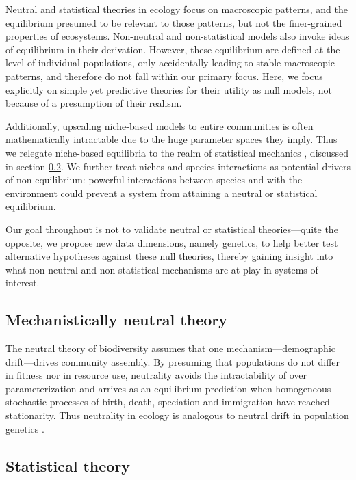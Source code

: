 \documentclass[12pt]{article}
\begin{document}
Neutral and statistical theories in ecology focus on macroscopic
patterns, and the equilibrium presumed to be relevant to those
patterns, but not the finer-grained properties of ecosystems. Non-neutral and
non-statistical models \citep[e.g.,][]{Tilman2004-xt, Chesson2000-uc}
also invoke ideas of equilibrium in their derivation. However, these
equilibrium are defined at the level of individual populations,
only accidentally leading to stable macroscopic patterns, and therefore do not
fall within our primary focus.  Here, we focus explicitly on simple yet
predictive theories for their utility as null models, not because of a
presumption of their realism.

Additionally, upscaling niche-based models to entire communities is
often mathematically intractable due to the huge parameter spaces they
imply.  Thus we relegate niche-based equilibria to the realm of
statistical mechanics \citep[as have others:][]{pueyo2007, neill2009,
  Harte2011-um}, discussed in section \ref{sec:statThr}. We further
treat niches and species interactions as potential drivers of
non-equilibrium: powerful interactions between species and with the
environment could prevent a system from attaining a neutral or
statistical equilibrium.

Our goal throughout is not to validate neutral or statistical
theories---quite the opposite, we propose new data dimensions, namely
genetics, to help better test alternative hypotheses against these
null theories, thereby gaining insight into what non-neutral and
non-statistical mechanisms are at play in systems of interest.

\subsection{Mechanistically neutral theory}

The neutral theory of biodiversity \citep[NTB;][]{Hubbell2001-dx}
assumes that one mechanism---demographic drift---drives community
assembly. By presuming that populations do not differ in fitness nor
in resource use, neutrality avoids the intractability of over
parameterization and arrives as an equilibrium prediction when
homogeneous stochastic processes of birth, death, speciation and
immigration have reached stationarity. Thus neutrality in ecology is
analogous to neutral drift in population genetics
\citep{Hubbell2001-dx}.

\subsection{Statistical theory} \label{sec:statThr}
% 
% 
\end{document}
